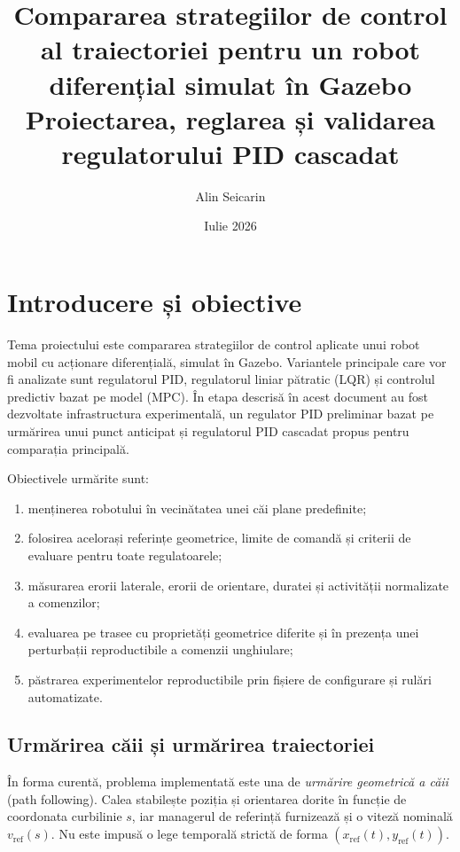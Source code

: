 \documentclass[12pt,a4paper,oneside]{report}
\title{%
  \textbf{Compararea strategiilor de control al traiectoriei pentru un robot
  diferențial simulat în Gazebo}\\[1.5em]
  \large Proiectarea, reglarea și validarea regulatorului PID cascadat
}
\author{Alin Seicarin}
\date{Iulie 2026}
\begin{document}
\maketitle
\tableofcontents
\clearpage

\chapter{Introducere și obiective}

Tema proiectului este compararea strategiilor de control aplicate unui robot
mobil cu acționare diferențială, simulat în Gazebo. Variantele principale care
vor fi analizate sunt regulatorul PID, regulatorul liniar pătratic (LQR) și
controlul predictiv bazat pe model (MPC). În etapa descrisă în acest document au
fost dezvoltate infrastructura experimentală, un regulator PID preliminar bazat
pe urmărirea unui punct anticipat și regulatorul PID cascadat propus pentru
comparația principală.

Obiectivele urmărite sunt:

\begin{enumerate}[label=\arabic*.]
  \item menținerea robotului în vecinătatea unei căi plane predefinite;
  \item folosirea acelorași referințe geometrice, limite de comandă și criterii
        de evaluare pentru toate regulatoarele;
  \item măsurarea erorii laterale, erorii de orientare, duratei și activității
        normalizate a comenzilor;
  \item evaluarea pe trasee cu proprietăți geometrice diferite și în prezența
        unei perturbații reproductibile a comenzii unghiulare;
  \item păstrarea experimentelor reproductibile prin fișiere de configurare și
        rulări automatizate.
\end{enumerate}

\section{Urmărirea căii și urmărirea traiectoriei}

În forma curentă, problema implementată este una de \emph{urmărire geometrică a
căii} (path following). Calea stabilește poziția și orientarea dorite în funcție
de coordonata curbilinie $s$, iar managerul de referință furnizează și o viteză
nominală $v_{\mathrm{ref}}(s)$. Nu este impusă o lege temporală strictă de
forma $(x_{\mathrm{ref}}(t),y_{\mathrm{ref}}(t))$.
\end{document}

